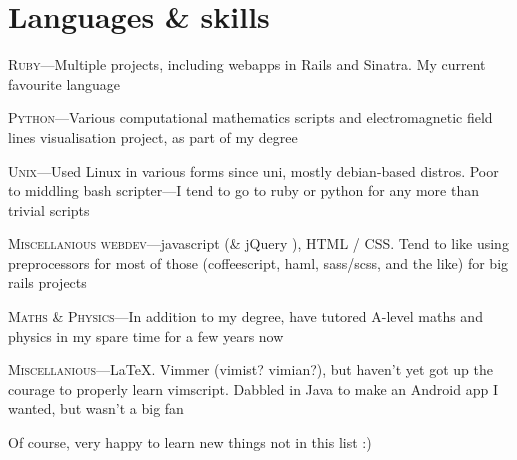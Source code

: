\documentclass[a4paper,10pt]{article}
\begin{document}
\section{Languages \& skills}

\textsc{Ruby}---Multiple projects, including webapps in Rails and Sinatra. My current favourite language

\textsc{Python}---Various computational mathematics scripts and electromagnetic field lines visualisation project, as part of my degree

  \textsc{Unix}---Used Linux in various forms since uni, mostly debian-based
  distros. Poor to middling bash scripter---I tend to go to ruby or python for any more than trivial scripts

  \textsc{Miscellanious webdev}---javascript (\& jQuery ), HTML / CSS. Tend to like using preprocessors for most of those (coffeescript, haml, sass/scss, and the like) for big rails projects

  \textsc{Maths \& Physics}---In addition to my degree, have tutored A-level maths and physics in my spare time for a few years now

  \textsc{Miscellanious}---LaTeX. Vimmer (vimist? vimian?), but haven't yet got up the courage to properly learn vimscript. Dabbled in Java to make an Android app I wanted, but wasn't a big fan

Of course, very happy to learn new things not in this list :)
\end{document}

